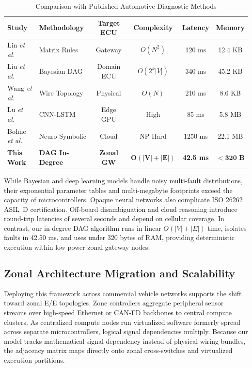 \documentclass[conference]{IEEEtran}
\begin{document}
\begin{table}[htbp]
\caption{Comparison with Published Automotive Diagnostic Methods}
\label{tab:comparison}
\centering
\scriptsize
\setlength{\tabcolsep}{1.8pt}
\begin{tabular}{@{}llcccc@{}}
\toprule
\textbf{Study} & \textbf{Methodology} & \textbf{Target ECU} & \textbf{Complexity} & \textbf{Latency} & \textbf{Memory} \\
\midrule
Lin \emph{et al.} \cite{lin2023zonal}     & Matrix Rules    & Gateway     & $O(N^2)$            & 120 ms           & 12.4 KB \\
Liu \emph{et al.} \cite{liu2023dag}       & Bayesian DAG    & Domain ECU  & $O(2^k |V|)$        & 340 ms           & 45.2 KB \\
Wang \emph{et al.} \cite{wang2023can}     & Wire Topology   & Physical    & $O(N)$              & 210 ms           & 8.6 KB  \\
Lu \emph{et al.} \cite{lu2025deep}        & CNN-LSTM        & Edge GPU    & High                & 85 ms            & 5.8 MB  \\
Bohne \emph{et al.} \cite{bohne2023neuro} & Neuro-Symbolic  & Cloud       & NP-Hard             & 1250 ms          & 22.1 MB \\
\midrule
\textbf{This Work}                        & \textbf{DAG In-Degree} & \textbf{Zonal GW} & $\mathbf{O(|V|{+}|E|)}$ & \textbf{42.5 ms} & $\mathbf{<320}$ \textbf{B} \\
\bottomrule
\end{tabular}
\end{table}

While Bayesian \cite{liu2023dag} and deep learning \cite{lu2025deep} models handle noisy multi-fault distributions, their exponential parameter tables and multi-megabyte footprints exceed the capacity of microcontrollers. Opaque neural networks also complicate ISO 26262 ASIL~D certification. Off-board disambiguation \cite{lin2023zonal} and cloud reasoning \cite{bohne2023neuro} introduce round-trip latencies of several seconds and depend on cellular coverage. In contrast, our in-degree DAG algorithm runs in linear $O(|V| + |E|)$ time, isolates faults in 42.50 ms, and uses under 320 bytes of RAM, providing deterministic execution within low-power zonal gateway nodes.

\subsection{Zonal Architecture Migration and Scalability}
Deploying this framework across commercial vehicle networks supports the shift toward zonal E/E topologies. Zone controllers aggregate peripheral sensor streams over high-speed Ethernet or CAN-FD backbones to central compute clusters. As centralized compute nodes run virtualized software formerly spread across separate microcontrollers, logical signal dependencies multiply. Because our model tracks mathematical signal dependency instead of physical wiring bundles, the adjacency matrix maps directly onto zonal cross-switches and virtualized execution partitions.
\end{document}
